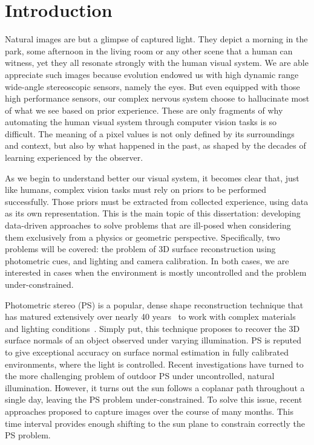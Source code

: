 \chapter*{Introduction}         %

Natural images are but a glimpse of captured light. They depict a morning in the park, some afternoon in the living room or any other scene that a human can witness, yet they all resonate strongly with the human visual system. We are able appreciate such images because evolution endowed us with high dynamic range wide-angle stereoscopic sensors, namely the eyes. But even equipped with those high performance sensors, our complex nervous system choose to hallucinate most of what we see based on prior experience. These are only fragments of why automating the human visual system through computer vision tasks is so difficult. The meaning of a pixel values is not only defined by its surroundings and context, but also by what happened in the past, as shaped by the decades of learning experienced by the observer.

As we begin to understand better our visual system, it becomes clear that, just like humans, complex vision tasks must rely on priors to be performed successfully. Those priors must be extracted from collected experience, using data as its own representation. This is the main topic of this dissertation: developing data-driven approaches to solve problems that are ill-posed when considering them exclusively from a physics or geometric perspective. Specifically, two problems will be covered: the problem of 3D surface reconstruction using photometric cues, and lighting and camera calibration. In both cases, we are interested in cases when the environment is mostly uncontrolled and the problem under-constrained.


Photometric stereo (PS) is a popular, dense shape reconstruction technique that has matured extensively over nearly 40 years~\cite{woodham-opteng-80} to work with complex materials and lighting conditions~\cite{alldrin-cvpr-08,basri-ijcv-07,johnson-cvpr-11,oxholm-eccv-12}.
Simply put, this technique proposes to recover the 3D surface normals of an object observed under varying illumination.
PS is reputed to give exceptional accuracy on surface normal estimation in fully calibrated environments, where the light is controlled.
Recent investigations have turned to the more challenging problem of outdoor PS under uncontrolled, natural illumination. However, it turns out the sun follows a coplanar path throughout a single day, leaving the PS problem under-constrained. To solve this issue, recent approaches proposed to capture images over the course of many months\cite{ackermann-cvpr-12,abrams-eccv-12}. This time interval provides enough shifting to the sun plane to constrain correctly the PS problem.

